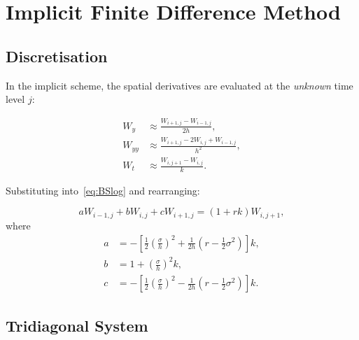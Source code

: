\documentclass[12pt,a4paper]{article}
\theoremstyle{plain}
\theoremstyle{definition}
\theoremstyle{remark}
\begin{document}
\section{Implicit Finite Difference Method}

\subsection{Discretisation}

In the implicit scheme, the spatial derivatives are evaluated at the
\emph{unknown} time level $j$:

\begin{align}
  W_{y}  &\approx\frac{W_{i+1,j}-W_{i-1,j}}{2h},\label{eq:imp_wy}\\
  W_{yy} &\approx\frac{W_{i+1,j}-2W_{i,j}+W_{i-1,j}}{h^{2}},\label{eq:imp_wyy}\\
  W_{t}  &\approx\frac{W_{i,j+1}-W_{i,j}}{k}.\label{eq:imp_wt}
\end{align}

Substituting into~\eqref{eq:BSlog} and rearranging:

\begin{keybox}
\begin{equation}\label{eq:implicit}
  aW_{i-1,j}+bW_{i,j}+cW_{i+1,j}=(1+rk)W_{i,j+1},
\end{equation}
where
\begin{align}
  a &= -\!\left[\frac{1}{2}\!\left(\frac{\sigma}{h}\right)^{\!2}
       +\frac{1}{2h}\!\left(r-\tfrac{1}{2}\sigma^{2}\right)\right]k,\nonumber\\
  b &= 1+\!\left(\frac{\sigma}{h}\right)^{\!2}k,\label{eq:abc_imp}\\
  c &= -\!\left[\frac{1}{2}\!\left(\frac{\sigma}{h}\right)^{\!2}
       -\frac{1}{2h}\!\left(r-\tfrac{1}{2}\sigma^{2}\right)\right]k.\nonumber
\end{align}
\end{keybox}

\subsection{Tridiagonal System}
\end{document}
